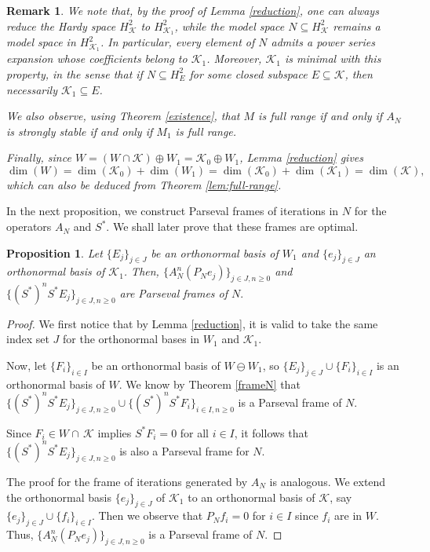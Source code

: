 \documentclass[a4paper,12pt]{amsart}
\def\KK{{\mathcal{K}}}
\newtheorem{proposition}[theorem]{Proposition}
\newtheorem{remark}[theorem]{Remark}
\theoremstyle{definition}
\begin{document}
% 
\begin{remark}
We note that, by the proof of Lemma \ref{reduction}, one can always reduce the
Hardy space $H^2_{\mathcal K}$ to $H^2_{\mathcal K_1}$, while the
model space $N \subseteq H^2_{\mathcal K}$ remains a model space in
$H^2_{\mathcal K_1}$. In particular, every element of $N$ admits a power series
expansion whose coefficients belong to $\KK_1$. Moreover, $\KK_1$ is minimal
with this property, in the sense that if $N \subseteq H^2_E$ for some closed
subspace $E \subseteq \KK$, then necessarily $\KK_1 \subseteq E$.

We also observe, using Theorem \ref{existence}, that $M$ is full range if and only if $A_N$ is strongly stable if and only if $M_1$ is full range.

Finally, since $W=(W\cap \KK)\oplus W_1=\KK_0\oplus W_1$, Lemma
\ref{reduction} gives
\[
\dim(W)=\dim(\KK_0)+\dim(W_1)
       =\dim(\KK_0)+\dim(\KK_1)
       =\dim(\KK),
\]
which  can also be deduced from Theorem \ref{lem:full-range}.
\end{remark}


In the next proposition, we construct Parseval frames of iterations in $N$ for the operators $A_N$ and $S^*$.
We shall later prove that these frames are optimal.
\begin{proposition}\label{W1}
 Let $\{E_j\}_{j\in J}$ be an orthonormal basis of $W_1$ and $\{e_j\}_{j\in J}$ an orthonormal basis of $\KK_1$. 
Then, $\{A_N^n (P_Ne_j)\}_{j\in J,n\geqslant 0}$ and
$\{(S^*)^n S^*E_j\}_{j\in J,n\geqslant 0}$ are Parseval frames of $N.$
\end{proposition}

\begin{proof}
We first notice that by Lemma \ref{reduction}, it is valid to take the same index set $J$ for the orthonormal bases in $W_1$ and $\KK_1$. 

Now, let $\{F_i\}_{i\in I}$ be an orthonormal basis of $W\ominus W_1$, so $\{E_j\}_{j\in J}\cup\{F_i\}_{i\in I}$ is an orthonormal basis of $W.$
We know by Theorem \ref{frameN} that $\{(S^*)^n S^*E_j\}_{ j\in J,n\geqslant 0}\cup\{(S^*)^n S^*F_i\}_{ i\in I,n\geqslant 0}$ is a Parseval frame of $N.$

Since $F_i \in W \cap \,\mathcal{K}$ implies $S^*F_i = 0$ for all $i \in I$, it follows that $\{(S^*)^n S^*E_j\}_{j\in J, n\geqslant 0}$ is also a Parseval frame for $N$.
 
The proof for the frame of iterations generated by $A_N$ is analogous. We extend the orthonormal basis $\{e_j\}_{j\in J}$ of $\KK_1$ to an orthonormal basis of $\KK$, say $\{e_j\}_{j\in J}\cup\{f_i\}_{i\in I}. $
Then we observe that $P_Nf_i = 0$ for $i\in I $ since $f_i$ are in $W.$ 
Thus, $\{A^n_N(P_Ne_j)\}_{ j\in J,n\geqslant 0}$ is a Parseval frame of $N$. 
\end{proof}
\end{document}
